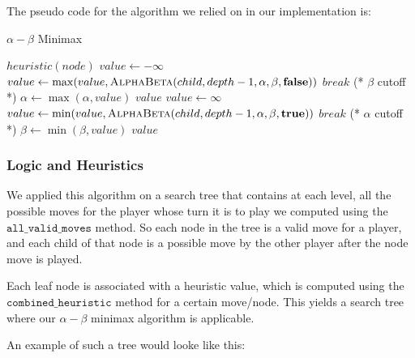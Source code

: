 \documentclass[11pt]{article}
\begin{document}
The pseudo code for the algorithm we relied on in our implementation is:

\begin{algorithm*}
\caption{ $\alpha - \beta$ Minimax}
\begin{algorithmic}
            \State \Return $heuristic(node)$
        \EndIf
            \State $value \gets -\infty$
                \State $value \gets \max(value, \Call{AlphaBeta}{child, depth - 1, \alpha, \beta, \textbf{false}})$
                    $break$ (* $\beta$ cutoff *)
                \EndIf
                \State $\alpha \gets \max(\alpha, value)$
            \EndFor
            \State \Return $value$
        \Else
            \State $value \gets \infty$
                \State $value \gets \min(value, \Call{AlphaBeta}{child, depth - 1, \alpha, \beta, \textbf{true}})$
                    $break$ (* $\alpha$ cutoff *)
                \EndIf
                \State $\beta \gets \min(\beta, value)$
            \EndFor
            \State \Return $value$
        \EndIf
    \EndFunction
\end{algorithmic}
\end{algorithm*}

\subsubsection*{Logic and Heuristics}

We applied this algorithm on a search tree that contains at each level, all the possible moves for the player whose turn it is to play
we computed using the $\texttt{all\_valid\_moves}$ method. So each node in the tree is a valid move for a player, and each child of that node is a possible move by the other player after the node move is played.

Each leaf node is associated with a heuristic value, which is computed using the $\texttt{combined\_heuristic}$ method for a certain move/node. This yields a search tree where our $\alpha - \beta$ minimax algorithm is applicable.

An example of such a tree would looke like this:
\\
\end{document}
